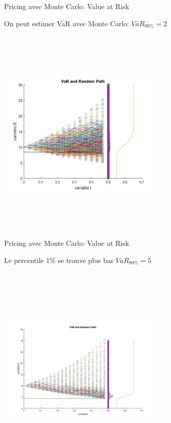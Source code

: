\documentclass[10pt]{beamer}
\begin{document}
\begin{frame}{Pricing avec Monte Carlo: Value at Risk}{}
  
On peut estimer VaR avec Monte Carlo: $VaR_{99\%}=2$ \\~\\

\includegraphics[width=8cm,height=10cm,keepaspectratio]{AAUgraphics/var.jpg}

\end{frame}


\begin{frame}{Pricing avec Monte Carlo: Value at Risk}{}
  
Le percentile 1\% se trouve plus bas $VaR_{99\%} = 5$\\~\\

\includegraphics[width=8cm,height=10cm,keepaspectratio]{AAUgraphics/var2.jpg}

\end{frame}
\end{document}
